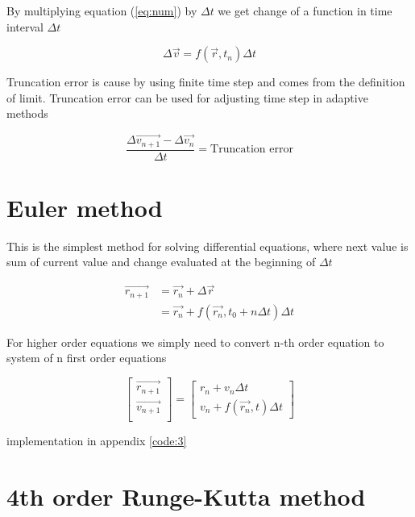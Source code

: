 \documentclass[english,12pt,a4paper, notitlepage]{report}
\begin{document}
	By multiplying equation (\ref{eq:num}) by $\Delta t$ we get change of a function in time interval $\Delta t$
	
	\begin{equation}
		\Delta \vec{v} = f(\vec{r}, t_n) \Delta t
	\end{equation}
	
	Truncation error is cause by using finite time step and comes from the definition of limit. Truncation error can be used for adjusting time step in adaptive methods
	
	\begin{equation}
		\frac{\Delta \vec{v_{n+1}} - \Delta \vec{v_n}}{\Delta t} = \text{Truncation error}
	\end{equation}
		
	\section{Euler method}
	This is the simplest method for solving differential equations, where next value is sum of current value and change evaluated at the beginning of $\Delta t$ 
		
	\begin{equation}
		\begin{split}
			\vec{r_{n+1}} &= \vec{r_{n}} + \Delta \vec{r} \\
			&= \vec{r_{n}} + f(\vec{r_n}, t_0 + n \Delta t) \Delta t
		\end{split}
	\end{equation}
	
	For higher order equations we simply need to convert n-th order equation to system of n first order equations
	
	\begin{equation}
		\begin{bmatrix}
			\vec{r_{n+1}}\\
			\vec{v_{n+1}}\\
		\end{bmatrix}
		=
		\begin{bmatrix}
			r_n + v_n \Delta t\\
			v_n + f(\vec{r_n}, t) \Delta t
		\end{bmatrix}
	\end{equation}
	
	implementation in appendix \ref{code:3}
	
	\section{4th order Runge-Kutta method}
	
\end{document}
